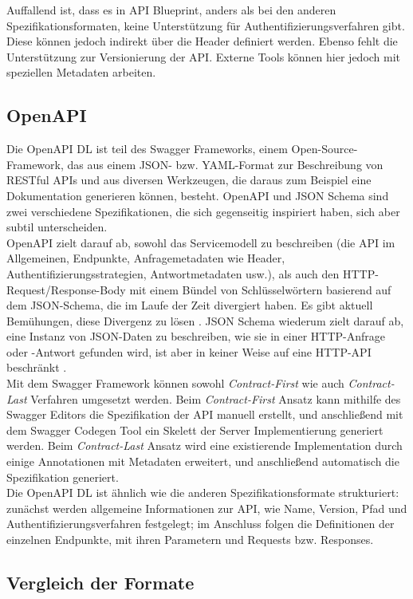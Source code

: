Auffallend ist, dass es in API Blueprint, anders als bei den anderen Spezifikationsformaten, keine Unterstützung für Authentifizierungsverfahren gibt. Diese können jedoch indirekt über die Header definiert werden. Ebenso fehlt die Unterstützung zur Versionierung der API. Externe Tools können hier jedoch mit speziellen Metadaten arbeiten.

\subsection{OpenAPI}

Die OpenAPI DL ist teil des Swagger Frameworks, einem Open-Source-Framework, das aus einem JSON- bzw. YAML-Format zur Beschreibung von RESTful APIs und aus diversen Werkzeugen, die daraus zum Beispiel eine Dokumentation generieren können, besteht. OpenAPI und JSON Schema sind zwei verschiedene Spezifikationen, die sich gegenseitig inspiriert haben, sich aber subtil unterscheiden. \\

OpenAPI zielt darauf ab, sowohl das Servicemodell zu beschreiben (die API im Allgemeinen, Endpunkte, Anfragemetadaten wie Header, Authentifizierungsstrategien, Antwortmetadaten usw.), als auch den HTTP-Request/Response-Body mit einem Bündel von Schlüsselwörtern basierend auf dem JSON-Schema, die im Laufe der Zeit divergiert haben. Es gibt aktuell Bemühungen, diese Divergenz zu lösen \parencite{sturgeon2018divergence}. JSON Schema wiederum zielt darauf ab, eine Instanz von JSON-Daten zu beschreiben, wie sie in einer HTTP-Anfrage oder -Antwort gefunden wird, ist aber in keiner Weise auf eine HTTP-API beschränkt \parencite{sturgeon2018harmony}. \\

Mit dem Swagger Framework können sowohl \emph{Contract-First} wie auch \emph{Contract-Last} Verfahren umgesetzt werden. Beim \emph{Contract-First} Ansatz kann mithilfe des Swagger Editors die Spezifikation der API manuell erstellt, und anschließend mit dem Swagger Codegen Tool ein Skelett der Server Implementierung generiert werden. Beim \emph{Contract-Last} Ansatz wird eine existierende Implementation durch einige Annotationen mit Metadaten erweitert, und anschließend automatisch die Spezifikation generiert. \\

Die OpenAPI DL ist ähnlich wie die anderen Spezifikationsformate strukturiert: zunächst werden allgemeine Informationen zur API, wie Name, Version, Pfad und Authentifizierungsverfahren festgelegt; im Anschluss folgen die Definitionen der einzelnen Endpunkte, mit ihren Parametern und Requests bzw. Responses.

\subsection{Vergleich der Formate}
